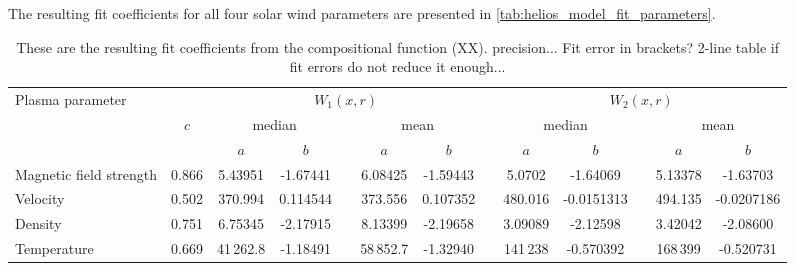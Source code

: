 The resulting fit coefficients for all four solar wind parameters are presented in \autoref{tab:helios_model_fit_parameters}.
\begin{table}[htb]\small
	\centering
	\captionsetup{belowskip=4pt}
	\caption{These are the resulting fit coefficients from the compositional function (XX). precision... Fit error in brackets? 2-line table if fit errors do not reduce it enough...}
	\begin{tabular}{lcccccccccccc}
		\toprule
		\multirow{3}{*}{Plasma parameter}	&	&\multicolumn{5}{c}{$W_1(x,r)$}	&	&\multicolumn{5}{c}{$W_2(x,r)$}\\
		\cmidrule{3-7}	\cmidrule{9-13}
			&$c$	&\multicolumn{2}{c}{median}	&	&\multicolumn{2}{c}{mean}	&	&\multicolumn{2}{c}{median}	&	&\multicolumn{2}{c}{mean}\\
		\cmidrule{3-4}	\cmidrule{6-7}	\cmidrule{9-10}	\cmidrule{12-13}
			&	&$a$	&$b$	&	&$a$	&$b$	&	&$a$	&$b$	&	&$a$	&$b$\\
		\midrule
		Magnetic field strength	&0.866	&5.43951	&-1.67441	&	&6.08425	&-1.59443	&	&5.0702	&-1.64069	&	&5.13378	&-1.63703\\
		Velocity		&0.502	&370.994	&0.114544	&	&373.556	&0.107352	&	&480.016	&-0.0151313	&	&494.135	&-0.0207186\\
		Density		&0.751	&6.75345	&-2.17915	&	&8.13399	&-2.19658	&	&3.09089	&-2.12598	&	&3.42042	&-2.08600\\
		Temperature		&0.669	&41\,262.8	&-1.18491	&	&58\,852.7	&-1.32940	&	&141\,238	&-0.570392	&	&168\,399	&-0.520731\\
		\bottomrule
	\end{tabular}
	\label{tab:helios_model_fit_parameters}
\end{table}

